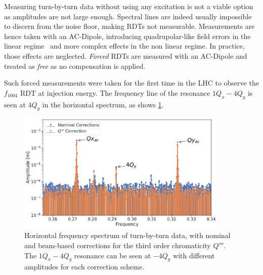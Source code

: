 Measuring turn-by-turn data without using any excitation is not a viable option as amplitudes are
not large enough. Spectral lines are indeed usually impossible to discern from the noise floor, 
making RDTs not measurable.
Measurements are hence taken with an AC-Dipole, introducing quadrupolar-like field errors in the 
linear regime~\cite{carlier_nonlinear_2020} and more complex effects in the non linear regime.
In practice, those effects are neglected. \textit{Forced} RDTs are measured with an
AC-Dipole and treated as \textit{free} as no compensation is applied.

Such forced measurements were taken for the first time in the LHC to observe the $f_{1004}$ RDT
at injection energy. The frequency line of the resonance $1Q_x - 4Q_y$ is seen at $4Q_y$ in the
horizontal spectrum, as shows \cref{fig:decapoles:rdts:spectrum_f1004}.

\begin{figure}[!htb]
    \centering
    \includegraphics[width=0.9\textwidth]{./images/f1004x_spectrum.pdf}
    \caption{Horizontal frequency spectrum of turn-by-turn data, with nominal and beam-based
    corrections for the third order chromaticity $Q'''$. The $1Q_x - 4Q_y$ resonance can be seen
    at $-4Q_y$ with different amplitudes for each correction scheme.}
    \label{fig:decapoles:rdts:spectrum_f1004}
\end{figure}

%

